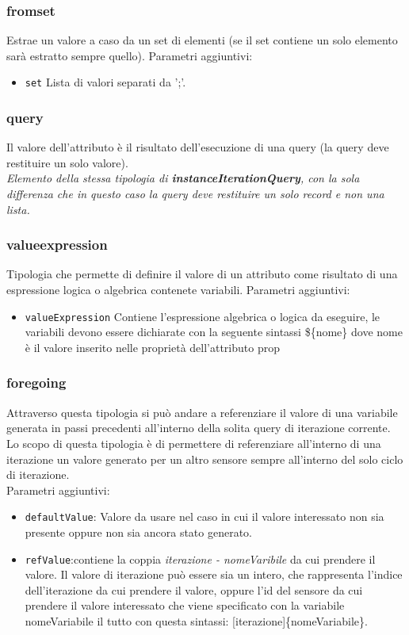\documentclass[12pt,a4paper,italian]{article}
\begin{document}

\subsubsection{\large{fromset}} Estrae un valore a caso da un set di elementi (se il set contiene un solo elemento sarà estratto sempre quello).
Parametri aggiuntivi:
\begin{itemize}
	\item \texttt{set} Lista di valori separati da ';'.
\end{itemize}
\subsubsection{\large{query}} Il valore dell'attributo è il risultato dell'esecuzione di una query (la query deve restituire un solo valore).\\
\newline
\emph{Elemento della stessa tipologia di \textbf{instanceIterationQuery}, con la sola differenza che in questo caso la query deve restituire un solo record e non una lista.}\\
\subsubsection{\large{valueexpression}} Tipologia che permette di definire il valore di un attributo come risultato di una espressione logica o algebrica contenete variabili.
Parametri aggiuntivi:
\begin{itemize}
	\item \texttt{valueExpression} Contiene l'espressione algebrica o logica da eseguire, le variabili devono essere dichiarate con la seguente sintassi \$\{nome\} dove nome è il valore inserito nelle proprietà dell'attributo prop
\end{itemize}
\subsubsection{\large{foregoing}} Attraverso questa tipologia si può andare a referenziare il valore di una variabile generata in passi precedenti all'interno della solita query di iterazione corrente.\\
Lo scopo di questa tipologia è di permettere di referenziare all'interno di una iterazione un valore generato per un altro sensore sempre all'interno del solo ciclo di iterazione.\\
Parametri aggiuntivi:
\begin{itemize}
	\item \texttt{defaultValue}: Valore da usare nel caso in cui il valore interessato non sia presente oppure non sia ancora stato generato.
	\item \texttt{refValue}:contiene la coppia \emph{iterazione - nomeVaribile} da cui prendere il valore. Il valore di iterazione può essere sia un intero, che rappresenta l'indice dell'iterazione 
	da cui prendere il valore, oppure l'id del sensore da cui prendere il valore interessato che viene specificato con la variabile nomeVariabile il tutto con questa sintassi: \@[iterazione]\{nomeVariabile\}.
\end{itemize}
\end{document}
